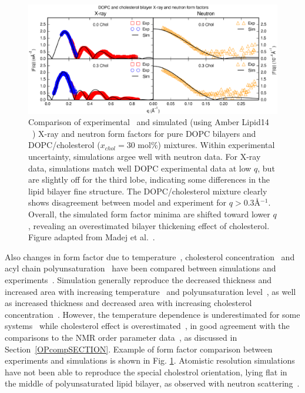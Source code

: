 \documentclass[aps,prl,superscriptaddress,twocolumn]{revtex4}
\begin{document}
\begin{figure}[]
  \includegraphics[width=17.2cm]{../Fig/FFcompMADEJ.eps}
\newline
  \caption{\label{FFcomp}
    Comparison of experimental~\cite{pan09,kucerka07b} and simulated (using Amber Lipid14 ~\cite{madej15}) X-ray and neutron form factors for pure DOPC bilayers and DOPC/cholesterol ($x_{chol} = 30$ mol\%) mixtures. Within experimental uncertainty, simulations argee well with neutron data. For X-ray data, simulations match well DOPC experimental data at low $q$, but are slightly off for the third lobe, indicating  some differences in the lipid bilayer fine structure. The DOPC/cholesterol mixture clearly shows disagreement between model and experiment for $q > 0.3$\AA$^{-1}$. Overall, the simulated form factor minima are shifted toward lower $q$, revealing an overestimated bilayer thickening effect of cholesterol. Figure adapted from Madej et al.~\cite{madej15}.
  } 
\end{figure}

Also changes in form factor due to temperature~\cite{jambeck12,zhuang14}, cholesterol concentration~\cite{jambeck13,madej15} 
and acyl chain polyunsaturation~\cite{eldho03,klauda12} have been compared between simulations and 
experiments~\cite{eldho03,kucerka05a,pan08,hodzic08,kucerka08,pan09,khelasvili10,kucerka11}.
Simulation generally reproduce the decreased thickness and increased area with increasing temperature~\cite{jambeck12,zhuang14} and 
polyunsaturation level~\cite{eldho03,klauda12}, 
as well as increased thickness and decreased area with increasing cholesterol concentration~\cite{jambeck13,madej15}.
However, the temperature dependence is underestimated for some systems~\cite{jambeck12,zhuang14} while cholesterol
effect is overestimated~\cite{jambeck13,madej15}, in good agreement with the comparisons to the NMR order parameter 
data~\cite{zhuang14,madej15}, as discussed in Section~\ref{OPcompSECTION}. Example of form factor comparison 
between experiments and simulations is shown in Fig. \ref{FFcomp}.
Atomistic resolution simulations have not been able to reproduce the special cholestrol orientation, lying flat in
the middle of polyunsaturated lipid bilayer, as observed with neutron scattering~\cite{harroun08,marrink08,kucerka10b}.
\end{document}
